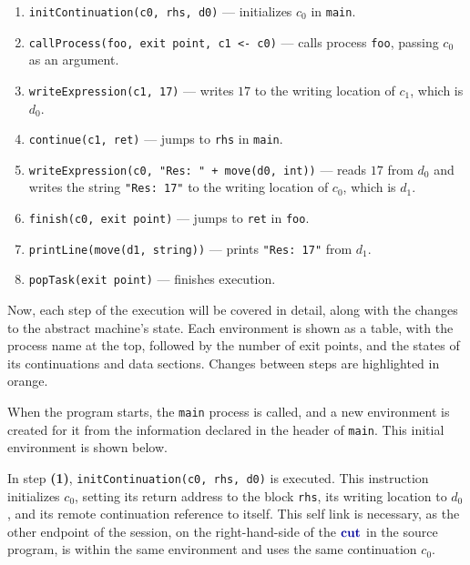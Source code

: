 \documentclass[sigconf,nonacm,natbib=true]{acmart}
\begin{document}
\begin{enumerate}[leftmargin=*]
  \item \texttt{initContinuation(c0, rhs, d0)} --- initializes $c_0$ in \texttt{main}.
  \item \texttt{callProcess(foo, exit point, c1 <- c0)} --- calls process \texttt{foo}, passing $c_0$ as an argument.
  \item \texttt{writeExpression(c1, 17)} --- writes $17$ to the writing location of $c_1$, which is $d_0$.
  \item \texttt{continue(c1, ret)} --- jumps to \texttt{rhs} in \texttt{main}.
  \item \texttt{writeExpression(c0, "Res:\ " + move(d0, int))} --- reads $17$ from $d_0$ and writes the string \texttt{"Res:\ 17"} to the writing location of $c_0$, which is $d_1$.
  \item \texttt{finish(c0, exit point)} --- jumps to \texttt{ret} in \texttt{foo}.
  \item \texttt{printLine(move(d1, string))} --- prints \texttt{"Res:\ 17"} from $d_1$.
  \item \texttt{popTask(exit point)} --- finishes execution.
\end{enumerate}

Now, each step of the execution will be covered in detail, along with the changes to the abstract machine's state. Each environment is shown as a table, with the process name at the top, followed by the number of exit points, and the states of its continuations and data sections. Changes between steps are highlighted in orange.

When the program starts, the \texttt{main} process is called, and a new environment is created for it from the information declared in the header of \texttt{main}. This initial environment is shown below.

\begin{center}
\end{center}

In step \textbf{(1)}, \texttt{initContinuation(c0, rhs, d0)} is executed. This instruction initializes $c_0$, setting its return address to the block \texttt{rhs}, its writing location to $d_0$, and its remote continuation reference to itself. This self link is necessary, as the other endpoint of the session, on the right-hand-side of the $\cutp$ in the source program, is within the same environment and uses the same continuation $c_0$.
\end{document}
